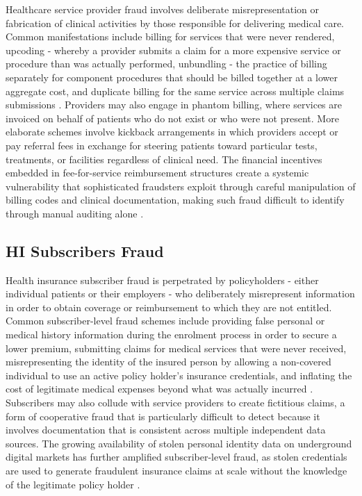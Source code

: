 Healthcare service provider fraud involves deliberate misrepresentation or fabrication of clinical activities by those responsible for delivering medical care. Common manifestations include billing for services that were never rendered, upcoding - whereby a provider submits a claim for a more expensive service or procedure than was actually performed, unbundling - the practice of billing separately for component procedures that should be billed together at a lower aggregate cost, and duplicate billing for the same service across multiple claims submissions \cite{kose2015}. Providers may also engage in phantom billing, where services are invoiced on behalf of patients who do not exist or who were not present. More elaborate schemes involve kickback arrangements in which providers accept or pay referral fees in exchange for steering patients toward particular tests, treatments, or facilities regardless of clinical need. The financial incentives embedded in fee-for-service reimbursement structures create a systemic vulnerability that sophisticated fraudsters exploit through careful manipulation of billing codes and clinical documentation, making such fraud difficult to identify through manual auditing alone \cite{rayan2019}.

\subsection{HI Subscribers Fraud}

Health insurance subscriber fraud is perpetrated by policyholders - either individual patients or their employers - who deliberately misrepresent information in order to obtain coverage or reimbursement to which they are not entitled. Common subscriber-level fraud schemes include providing false personal or medical history information during the enrolment process in order to secure a lower premium, submitting claims for medical services that were never received, misrepresenting the identity of the insured person by allowing a non-covered individual to use an active policy holder's insurance credentials, and inflating the cost of legitimate medical expenses beyond what was actually incurred \cite{ahmed2014}. Subscribers may also collude with service providers to create fictitious claims, a form of cooperative fraud that is particularly difficult to detect because it involves documentation that is consistent across multiple independent data sources. The growing availability of stolen personal identity data on underground digital markets has further amplified subscriber-level fraud, as stolen credentials are used to generate fraudulent insurance claims at scale without the knowledge of the legitimate policy holder \cite{thaifur2021}.


